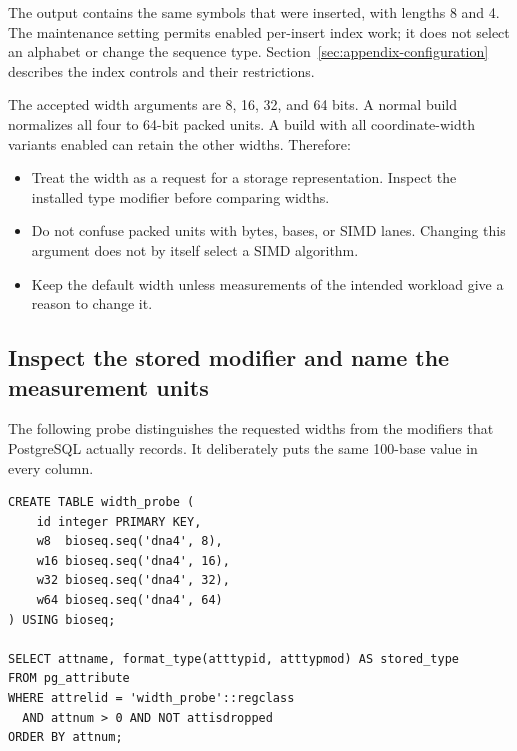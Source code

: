 The output contains the same symbols that were inserted, with lengths 8 and
4. The maintenance setting permits enabled per-insert index work; it does not
select an alphabet or change the sequence type. Section~\ref{sec:appendix-configuration}
describes the index controls and their restrictions.

The accepted width arguments are 8, 16, 32, and 64 bits. A normal build
normalizes all four to 64-bit packed units. A build with all coordinate-width
variants enabled can retain the other widths. Therefore:
\begin{itemize}
  \item Treat the width as a request for a storage representation. Inspect the
    installed type modifier before comparing widths.
  \item Do not confuse packed units with bytes, bases, or SIMD lanes.
    Changing this argument does not by itself select a SIMD algorithm.
  \item Keep the default width unless measurements of the intended workload
    give a reason to change it.
\end{itemize}

\subsection{Inspect the stored modifier and name the measurement units}

The following probe distinguishes the requested widths from the modifiers
that PostgreSQL actually records. It deliberately puts the same 100-base
value in every column.

\par\noindent\begin{minipage}{\linewidth}
\begin{lstlisting}[style=bioseq-appendix-sql]
CREATE TABLE width_probe (
    id integer PRIMARY KEY,
    w8  bioseq.seq('dna4', 8),
    w16 bioseq.seq('dna4', 16),
    w32 bioseq.seq('dna4', 32),
    w64 bioseq.seq('dna4', 64)
) USING bioseq;

SELECT attname, format_type(atttypid, atttypmod) AS stored_type
FROM pg_attribute
WHERE attrelid = 'width_probe'::regclass
  AND attnum > 0 AND NOT attisdropped
ORDER BY attnum;
\end{lstlisting}
\end{minipage}

